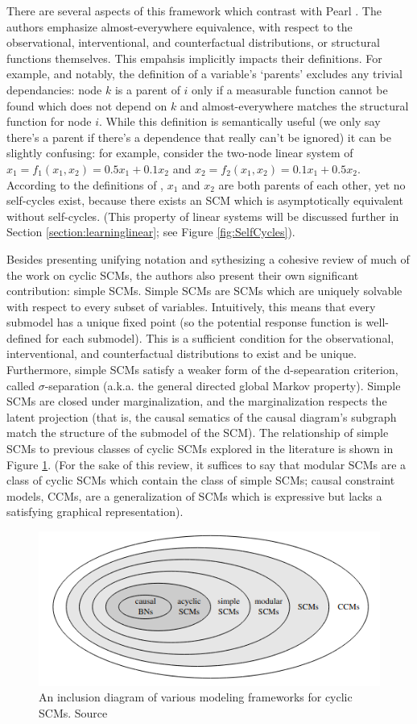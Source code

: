 \documentclass[letterpaper,10pt]{article}
\begin{document}
There are several aspects of this framework which contrast with Pearl \cite{pearl_2009}.
The authors emphasize almost-everywhere equivalence, with respect to the observational, interventional, and counterfactual distributions, or structural functions themselves. This empahsis implicitly impacts their definitions. For example, and notably, the definition of a variable's `parents' excludes any trivial dependancies: node $k$ is a parent of $i$ only if a measurable function cannot be found which does not depend on $k$ and almost-everywhere matches the structural function for node $i$. While this definition is semantically useful (we only say there's a parent if there's a dependence that really can't be ignored) it can be slightly confusing: for example, consider the two-node linear system of $x_1 = f_1(x_1,x_2)=0.5x_1+0.1x_2$ and $x_2 = f_2(x_1,x_2)=0.1x_1+0.5x_2$. According to the definitions of \cite{Foundations}, $x_1$ and $x_2$ are both parents of each other, yet no self-cycles exist, because there exists an SCM which is asymptotically equivalent without self-cycles. (This property of linear systems will be discussed further in Section \ref{section:learninglinear}; see Figure \ref{fig:SelfCycles}).

Besides presenting unifying notation and sythesizing a cohesive review of much of the work on cyclic SCMs, the authors also present their own significant contribution: simple SCMs. Simple SCMs are SCMs which are uniquely solvable with respect to every subset of variables. Intuitively, this means that every submodel has a unique fixed point (so the potential response function is well-defined for each submodel). This is a sufficient condition for the observational, interventional, and counterfactual distributions to exist and be unique. Furthermore, simple SCMs satisfy a weaker form of the d-sepearation criterion, called $\sigma$-separation (a.k.a. the general directed global Markov property). Simple SCMs are closed under marginalization, and the marginalization respects the latent projection (that is, the causal sematics of the causal diagram's subgraph match the structure of the submodel of the SCM).
The relationship of simple SCMs to previous classes of cyclic SCMs explored in the literature is shown in Figure \ref{fig:CylicClasses}. 
(For the sake of this review, it suffices to say that modular SCMs are a class of cyclic SCMs which contain the class of simple SCMs; causal constraint models, CCMs, are a generalization of SCMs which is expressive but lacks a satisfying graphical representation).
\begin{figure}
\centering
\includegraphics[width=.6\linewidth]{pics/cyclic_classes.png}
\caption{An inclusion diagram of various modeling frameworks for cyclic SCMs. Source\cite{Foundations}}
\label{fig:CylicClasses}
\end{figure}
\end{document}
